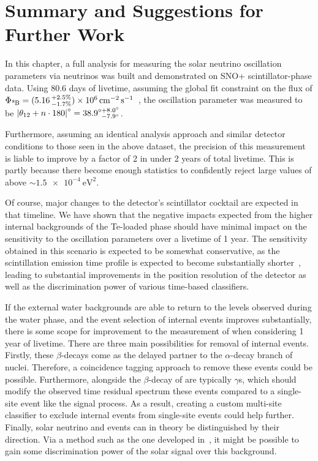 \section{Summary and Suggestions for Further Work}
In this chapter, a full analysis for measuring the solar neutrino oscillation parameters via \beight{} neutrinos was built and demonstrated on SNO+ scintillator-phase data. Using 80.6 days of livetime, assuming the global fit constraint on the \beight{} flux of $\Phi_{\beight{}} = (5.16\,^{+2.5\%}_{-1.7\%})\times 10^{6}\,\si{\per\cm\squared\per\second}$~\cite{bergstromUpdatedDeterminationSolar2016}, %
the oscillation parameter \tonetwo{} was measured to be $\left|\theta_{12}{} + n\cdot180\right|^{\circ} = 38.9^{\circ+8.0^{\circ}}_{\phantom{\circ}-7.9^{\circ}}$.

Furthermore, assuming an identical analysis approach and similar detector conditions to those seen in the above dataset, the precision of this measurement is liable to improve by a factor of 2 in under 2 years of total livetime. This is partly because there become enough statistics to confidently reject large values of \dmsq{} above $\sim\SI{1.5e-4}{\eV\squared}$.

Of course, major changes to the detector's scintillator cocktail are expected in that timeline. We have shown that the negative impacts expected from the higher internal backgrounds of the Te-loaded phase should have minimal impact on the sensitivity to the oscillation parameters over a livetime of 1 year. The sensitivity obtained in this scenario is expected to be somewhat conservative, as the scintillation emission time profile is expected to become substantially shorter~\cite{autyMethodLoadTellurium2023}, %
leading to substantial improvements in the position resolution of the detector as well as the discrimination power of various time-based classifiers.

If the external water backgrounds are able to return to the levels observed during the water phase, and the event selection of internal  events improves substantially, there is some scope for improvement to the measurement of \tonetwo{} when considering 1 year of livetime. There are three main possibilities for removal of internal  events. Firstly, these $\beta$-decays come as the delayed partner to the $\alpha$-decay branch of  nuclei. Therefore, a coincidence tagging approach to remove these events could be possible. Furthermore, alongside the $\beta$-decay of  are typically $\gamma$s, which should modify the observed time residual spectrum these events compared to a single-site event like the signal process. As a result, creating a custom multi-site classifier to exclude internal  events from single-site events could help further. Finally, solar neutrino and  events can in theory be distinguished by their direction. Via a method such as the one developed in~\cite{allegaEventbyEventDirectionReconstruction2023,patonDirectionalReconstructionLiquid2023}, %
it might be possible to gain some discrimination power of the solar signal over this background.

